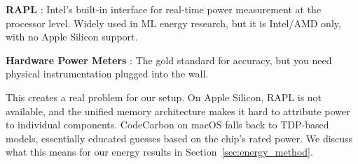 \documentclass[11pt,a4paper]{article}
\begin{document}
\textbf{RAPL} \cite{david2010rapl}: Intel's built-in interface for real-time power measurement at the processor level. Widely used in ML energy research, but it is Intel/AMD only, with no Apple Silicon support.

\textbf{Hardware Power Meters} \cite{conti2023multiport}: The gold standard for accuracy, but you need physical instrumentation plugged into the wall.

This creates a real problem for our setup. On Apple Silicon, RAPL is not available, and the unified memory architecture makes it hard to attribute power to individual components. CodeCarbon on macOS falls back to TDP-based models, essentially educated guesses based on the chip's rated power. We discuss what this means for our energy results in Section~\ref{sec:energy_method}.

\end{document}
